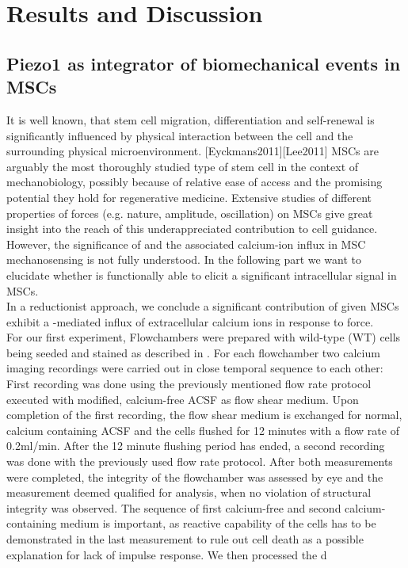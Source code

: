 \chapter{Results and Discussion}

\section{Piezo1 as integrator of biomechanical events in MSCs}

It is well known, that stem cell migration, differentiation and self-renewal is significantly influenced by physical interaction between the cell and the surrounding physical microenvironment. [Eyckmans2011][Lee2011] MSCs are arguably the most thoroughly studied type of stem cell in the context of mechanobiology, possibly because of relative ease of access and the promising potential they hold for regenerative medicine. Extensive studies of different properties of forces (e.g. nature, amplitude, oscillation) on MSCs give great insight into the reach of this underappreciated contribution to cell guidance. However, the significance of \Piezo{} and the associated calcium-ion influx in MSC mechanosensing is not fully understood. In the following part we want to elucidate whether \Piezo{} is functionally able to elicit a significant intracellular signal in MSCs.\\
In a reductionist approach, we conclude a significant contribution of \Piezo{} given MSCs exhibit a \Piezo{}-mediated influx of extracellular calcium ions in response to force. \\
For our first experiment, Flowchambers were prepared with wild-type (WT) cells being seeded and stained as described in . For each flowchamber two calcium imaging recordings were carried out in close temporal sequence to each other: First recording was done using the previously mentioned flow rate protocol executed with modified, calcium-free ACSF as flow shear medium. Upon completion of the first recording, the flow shear medium is exchanged for normal, calcium containing ACSF and the cells flushed for 12 minutes with a flow rate of 0.2ml/min. After the 12 minute flushing period has ended, a second recording was done with the previously used flow rate protocol. After both measurements were completed, the integrity of the flowchamber was assessed by eye and the measurement deemed qualified for analysis, when no violation of structural integrity was observed. The sequence of first calcium-free and second calcium-containing medium is important, as reactive capability of the cells has to be demonstrated in the last measurement to rule out cell death as a possible explanation for lack of impulse response. We then processed the d


